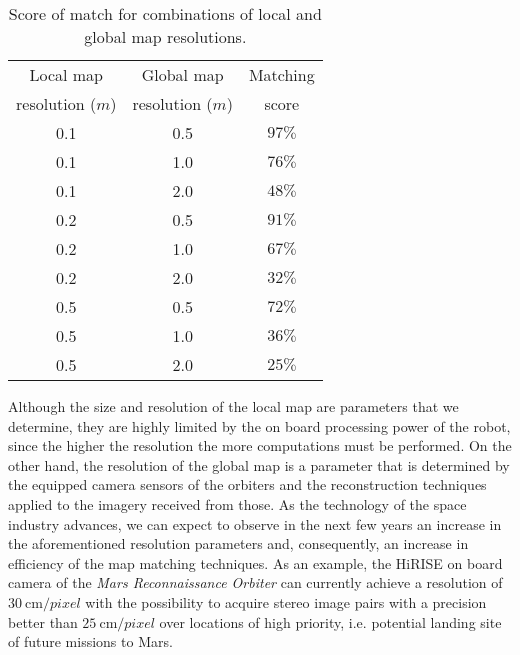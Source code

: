 \begin{table}[h!]
    \centering
    \begin{tabular}{| c | c || c |}
        \hline
        Local map & Global map & Matching \\
        resolution ($m$) & resolution ($m$) & score \\
        \hline
        \hline
        0.1 & 0.5 & $97\%$ \\
        \hline
        0.1 & 1.0 & $76\%$ \\
        \hline
        0.1 & 2.0 & $48\%$ \\
        \hline
        \hline
        0.2 & 0.5 & $91\%$ \\
        \hline
        0.2 & 1.0 & $67\%$ \\
        \hline
        0.2 & 2.0 & $32\%$ \\
        \hline
        \hline
        0.5 & 0.5 & $72\%$ \\
        \hline
        0.5 & 1.0 & $36\%$ \\
        \hline
        0.5 & 2.0 & $25\%$ \\
        \hline
    \end{tabular}
    \caption[Local and global map resolution viability]{
        Score of match for combinations of local and global map resolutions.
    }
    \label{table:map_resolutions}
\end{table}

Although the size and resolution of the local map are parameters that we
determine, they are highly limited by the on board processing power of the
robot, since the higher the resolution the more computations must be performed.
On the other hand, the resolution of the global map is a parameter that is
determined by the equipped camera sensors of the orbiters and the
reconstruction techniques applied to the imagery received from those.
As the technology of the space industry advances, we can expect to observe
in the next few years an increase in the aforementioned resolution parameters
and, consequently, an increase in efficiency of the map matching techniques.
As an example, the HiRISE on board camera of the
\textit{Mars Reconnaissance Orbiter} can currently achieve a resolution of
$\SI{30}{\cm \per pixel}$ with the possibility to acquire stereo image pairs
with a precision better than $\SI{25}{\cm \per pixel}$ over locations of
high priority, i.e. potential landing site of future missions to Mars.

